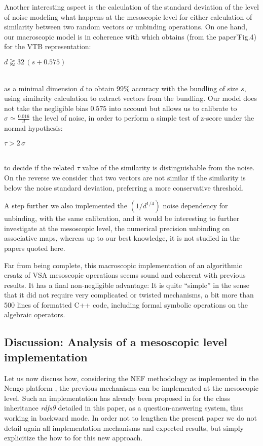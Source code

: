 \documentclass[sn-mathphys]{sn-jnl}
\newcommand{\eqline}[1]{~\vspace{0.1cm}\\\centerline{$#1$}\vspace{0.1cm}\\}
\begin{document}
Another interesting aspect is the calculation of the standard deviation of the level of noise modeling what happens at the mesoscopic level for either calculation of similarity between two random vectors or unbinding operations. On one hand, our macroscopic model is in coherence with \cite{schlegel_comparison_2020} which obtains (from the paper'Fig.4) for the VTB representation:
\eqline{d \gtrapprox 32 \, (s + 0.575)}
as a minimal dimension $d$ to obtain 99\% accuracy with the bundling of size $s$, using similarity calculation to extract vectors from the bundling. Our model does not take the negligible bias $0.575$ into account but allows us to calibrate to $\sigma \simeq \frac{0.016}{d}$ the level of noise, in order to perform a simple test of z-score under the normal hypothesis:
\eqline{\tau > 2 \, \sigma}
to decide if the related $\tau$ value of the similarity is distinguishable from the noise. On the reverse we consider that two vectors are not similar if the similarity is below the noise standard deviation, preferring a more conservative threshold.

A step further we also implemented the $(1/d^{1/4})$ noise dependency for unbinding, with the same calibration, and it would be interesting to further investigate at the mesoscopic level, the numerical precision unbinding on associative maps, whereas up to our best knowledge, it is not studied in the papers quoted here.

Far from being complete, this macroscopic implementation of an algorithmic ersatz of VSA mesoscopic operations seems sound and coherent with previous results. It has a final non-negligible advantage: It is quite ``simple'' in the sense that it did not require very complicated or twisted mechanisms, a bit more than 500 lines of formatted C++ code, including formal symbolic operations on the algebraic operators.

\subsection{Discussion: Analysis of a mesoscopic level implementation}\label{nengo}

Let us now discuss how, considering the NEF methodology \cite{eliasmith_how_2013} as implemented in the Nengo platform \cite{bekolay_nengo_2014}, the previous mechanisms can be implemented at the mesoscopic level. Such an implementation has already been proposed in \cite{mercier_ontology_2021} for the class inheritance \textit{rdfs9} detailed in this paper, as a question-answering system, thus working in backward mode. In order not to lengthen the present paper we do not detail again all implementation mechanisms and expected results, but simply explicitize the how to for this new approach. %
\end{document}
